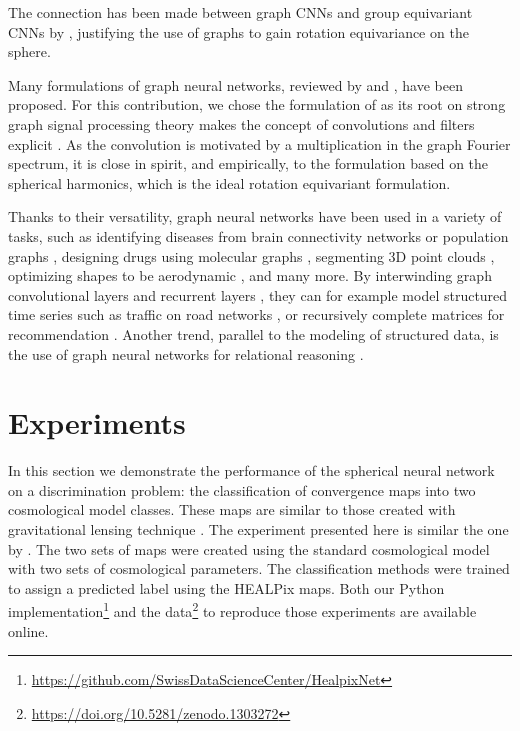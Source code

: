 \documentclass[final,twocolumn,3p,times,authoryear]{elsarticle}
\newcommand{\todo}[1]{{\color[rgb]{.6,.1,.6}{#1}}}
\newcommand{\1}{\b{1}}              %
\newcommand{\0}{\b{0}}              %
\begin{document}
The connection has been made between graph CNNs and group equivariant CNNs by \citet{kondor2018equivariance}, justifying the use of graphs to gain rotation equivariance on the sphere. 
\todo{More here.}

Many formulations of graph neural networks, reviewed by \citet{bronstein2017review} and \citet{hamilton2017review}, have been proposed. For this contribution, we chose the formulation of \citet{defferrard2016convolutional} as its root on strong graph signal processing theory makes the concept of convolutions and filters explicit \citep{shuman2013emerging}. As the convolution is motivated by a multiplication in the graph Fourier spectrum, it is close in spirit, and empirically, to the formulation based on the spherical harmonics, which is the ideal rotation equivariant formulation.


Thanks to their versatility, graph neural networks have been used in a variety of tasks, such as identifying diseases from brain connectivity networks \citep{ktena2018metriclearning} or population graphs \citep{parisot2017disease}, designing drugs using molecular graphs \citep{hop2018drugdesign}, segmenting 3D point clouds \citep{qi2017pointcloudsegmentation}, optimizing shapes to be aerodynamic \citep{baque2018shape}, and many more.
By interwinding graph convolutional layers and recurrent layers \citep{seo2016gcrn}, they can for example model structured time series such as traffic on road networks \citep{li2018traffic}, or recursively complete matrices for recommendation \citep{monti2017recommendation}.
Another trend, parallel to the modeling of structured data, is the use of graph neural networks for relational reasoning \citep{battaglia2018review}.

\section{Experiments}
\label{sec:experiments}

In this section we demonstrate the performance of the spherical neural network on a discrimination problem: the classification of convergence maps into two cosmological model classes.
These maps are similar to those created with gravitational lensing technique \citep{chang2017curvedsky}.
The experiment presented here is similar the one by \citet{schmelze2017cosmologicalmodel}.
The two sets of maps were created using the standard cosmological model with two sets of cosmological parameters.
The classification methods were trained to assign a predicted label using the HEALPix maps.
Both our Python implementation\footnote{\url{https://github.com/SwissDataScienceCenter/HealpixNet}} and the data\footnote{\url{https://doi.org/10.5281/zenodo.1303272}} to reproduce those experiments are available online.
\end{document}
